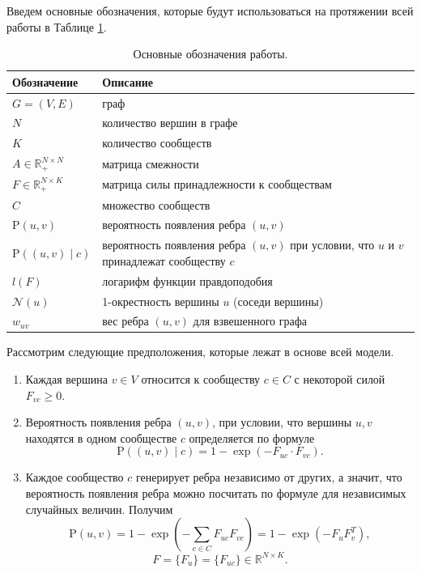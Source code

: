 \documentclass{ITaSconf}
\def\PP{\mathrm{P}}
\begin{document}
	Введем основные обозначения, которые будут использоваться на протяжении всей работы в Таблице \ref{table:notation}. 
	\begin{table}[!t]
		{
			\centering
			\small
			\begin{tabular}{ p{5.5em}   p{17.5em} }
				\hline
				\hline
				Обозначение 						& Описание \\
				\hline
				$G = (V,E) $ 						& граф \\             
				$N$    								& количество вершин в графе \\  
				$K$    								& количество сообществ \\      
				$A \in \mathbb{R}_{+}^{N\times N}$  & матрица смежности   \\
				$F \in \mathbb{R}_{+}^{N\times K}$  & матрица силы принадлежности к сообществам			\\
				$C$    								& множество сообществ  \\
				$\PP(u,v)$							& вероятность появления ребра $(u,v)$ \\
				$\PP((u,v) \mid c)$ 					& вероятность появления ребра $(u,v)$ при условии, что $u$ и $v$ принадлежат сообществу $c$ \\
				
				$l(F)$								& логарифм функции правдоподобия \\
				$\mathcal{N}(u)$ 					& 1-окрестность вершины $u$ (соседи вершины) \\
				$w_{uv}$							& вес ребра $(u,v)$ для взвешенного графа \\
				\hline
				\hline
			\end{tabular}
		}
		\caption{Основные обозначения работы.}
		\label{table:notation}
	\end{table}
	Рассмотрим следующие предположения, которые лежат в основе всей модели.
	\begin{enumerate}
		\item Каждая вершина $v\in V$ относится к сообществу $c \in C$ с некоторой силой
		$F_{vc} \ge 0.$
		\item Вероятность появления ребра $(u,v)$, при условии, что вершины $u,v$ находятся в одном сообществе $c$ определяется по формуле 
		$$\PP((u,v) \mid c)=1 - \exp(-F_{uc}\cdot F_{vc}).$$
		\item Каждое сообщество $c$ генерирует ребра независимо от других, а значит, что вероятность появления ребра можно посчитать по формуле для независимых случайных величин. Получим
		$$\PP(u,v)=1 - \exp(-\sum_{c\in C} F_{uc} F_{vc}) = 1 - \exp( - F_{u} F_{v}^T),$$
		$$F = \{F_u\} = \{F_{uc}\} \in \mathbb {R}^{N \times K}. $$
	\end{enumerate}
	
\end{document}
